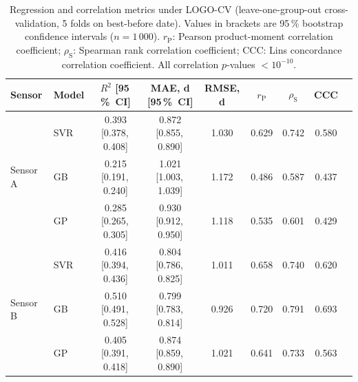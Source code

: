 \begin{table}[t]
\centering
\caption{Regression and correlation metrics under LOGO-CV (leave-one-group-out cross-validation, 5 folds on best-before date). Values in brackets are 95\,\% bootstrap confidence intervals ($n = 1\,000$). $r_{\mathrm{P}}$: Pearson product-moment correlation coefficient; $\rho_{\mathrm{S}}$: Spearman rank correlation coefficient; CCC: Lin\textquotesingle{}s concordance correlation coefficient. All correlation $p$-values $< 10^{-10}$.}
\label{tab:logo_metrics}
\begin{tabular}{@{}llccccccc@{}}
\toprule
Sensor & Model & $R^2$ [95\,\%~CI] & MAE, d [95\,\%~CI] & RMSE, d & $r_{\mathrm{P}}$ & $\rho_{\mathrm{S}}$ & CCC \\
\midrule
\multirow{3}{*}{Sensor A} & SVR & 0.393 [0.378,\,0.408] & 0.872 [0.855,\,0.890] & 1.030 & 0.629 & 0.742 & 0.580 \\
 & GB & 0.215 [0.191,\,0.240] & 1.021 [1.003,\,1.039] & 1.172 & 0.486 & 0.587 & 0.437 \\
 & GP & 0.285 [0.265,\,0.305] & 0.930 [0.912,\,0.950] & 1.118 & 0.535 & 0.601 & 0.429 \\
\midrule
\multirow{3}{*}{Sensor B} & SVR & 0.416 [0.394,\,0.436] & 0.804 [0.786,\,0.825] & 1.011 & 0.658 & 0.740 & 0.620 \\
 & GB & 0.510 [0.491,\,0.528] & 0.799 [0.783,\,0.814] & 0.926 & 0.720 & 0.791 & 0.693 \\
 & GP & 0.405 [0.391,\,0.418] & 0.874 [0.859,\,0.890] & 1.021 & 0.641 & 0.733 & 0.563 \\
\bottomrule
\end{tabular}
\end{table}
